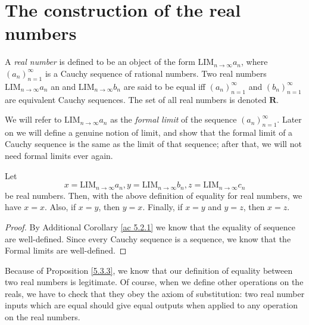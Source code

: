 \section{The construction of the real numbers}\label{sec 5.3}

\begin{definition}\label{5.3.1}
    A \emph{real number} is defined to be an object of the form \(\text{LIM}_{n \to \infty} a_n\), where \((a_n)_{n = 1}^{\infty}\) is a Cauchy sequence of rational numbers.
    Two real numbers \(\text{LIM}_{n \to \infty} a_n\) an and \(\text{LIM}_{n \to \infty} b_n\) are said to be equal iff \((a_n)_{n = 1}^{\infty}\) and \((b_n)_{n = 1}^{\infty}\) are equivalent Cauchy sequences.
    The set of all real numbers is denoted \(\mathbf{R}\).
\end{definition}

\begin{note}
    We will refer to \(\text{LIM}_{n \to \infty} a_n\) as the \emph{formal limit} of the sequence \((a_n)_{n = 1}^{\infty}\).
    Later on we will define a genuine notion of limit, and show that the formal limit of a Cauchy sequence is the same as the limit of that sequence;
    after that, we will not need formal limits ever again.
\end{note}

\setcounter{theorem}{2}
\begin{proposition}\label{5.3.3}
    Let
    \[
        x = \text{LIM}_{n \to \infty} a_n, y = \text{LIM}_{n \to \infty} b_n, z = \text{LIM}_{n \to \infty} c_n
    \]
    be real numbers.
    Then, with the above definition of equality for real numbers, we have \(x = x\).
    Also, if \(x = y\), then \(y = x\).
    Finally, if \(x = y\) and \(y = z\), then \(x = z\).
\end{proposition}

\begin{proof}
    By Additional Corollary \ref{ac 5.2.1} we know that the equality of sequence are well-defined.
    Since every Cauchy sequence is a sequence, we know that the Formal limits are well-defined.
\end{proof}

\begin{note}
    Because of Proposition \ref{5.3.3}, we know that our definition of equality between two real numbers is legitimate.
    Of course, when we define other operations on the reals, we have to check that they obey the axiom of substitution:
    two real number inputs which are equal should give equal outputs when applied to any operation on the real numbers.
\end{note}

